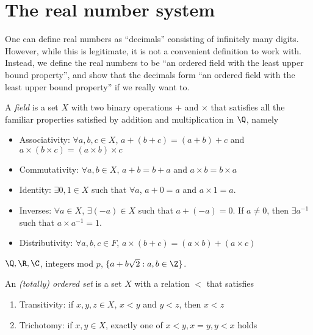 \documentclass[a4paper]{article}
\begin{document}
\tableofcontents

\section{The real number system}
One can define real numbers as ``decimals'' consisting of infinitely many digits. However, while this is legitimate, it is not a convenient definition to work with. Instead, we define the real numbers to be ``an ordered field with the least upper bound property'', and show that the decimals form ``an ordered field with the least upper bound property'' if we really want to.
\begin{defi}[Field]
  A \emph{field} is a set $X$ with two binary operations $+$ and $\times$ that satisfies all the familiar properties satisfied by addition and multiplication in $\Q$, namely
  \begin{itemize}
    \item Associativity: $\forall a, b, c\in X$, $a + (b + c) = (a + b) + c$ and $a\times (b\times c) = (a\times b)\times c$
    \item Commutativity: $\forall a, b\in X$, $a + b = b + a$ and $a\times b= b\times a$
    \item Identity: $\exists 0, 1\in X$ such that $\forall a$, $a + 0 = a$ and $a\times 1 = a$.
    \item Inverses: $\forall a\in X$, $\exists (-a)\in X$ such that $a + (-a) = 0$. If $a\not= 0$, then $\exists a^{-1}$ such that $a\times a^{-1} = 1$.
    \item Distributivity: $\forall a, b, c\in F$, $a\times (b + c) = (a\times b) + (a\times c)$
  \end{itemize}
\end{defi}

\begin{eg}
  $\Q, \R, \C$, integers mod $p$, $\{a + b\sqrt{2}: a, b\in \Z\}$.
\end{eg}

\begin{defi}
  An \emph{(totally) ordered set} is a set $X$ with a relation $<$ that satisfies
  \begin{enumerate}
    \item Transitivity: if $x, y, z\in X$, $x < y$ and $y < z$, then $x < z$
    \item Trichotomy: if $x, y\in X$, exactly one of $x < y, x = y, y < x$ holds
  \end{enumerate}
\end{defi}
\end{document}
